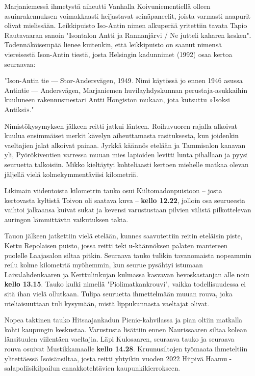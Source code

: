 \documentclass[10pt,finnish,a5paper,headings=small,twoside=semi]{scrartcl}
\begin{document}
\begin{multicols}{2}
	Marjaniemessä ihmetystä aiheutti Vanhalla Koivuniementiellä olleen
	asuinrakennuksen voimakkaasti heijastavat seinäpaneelit, joista
	varmasti naapurit olivat mielissään. Leikkipuisto Iso-Antin nimen
	alkuperää yritettiin tavata Tapio Rautavaaran sanoin "Isontalon Antti
	ja Rannanjärvi / Ne jutteli kaharen kesken". Todennäköisempää lienee
	kuitenkin, että leikkipuisto on saanut nimensä viereisestä Ison-Antin
	tiestä, josta Helsingin kadunnimet (1992) osaa kertoa seuraavaa:

	"Ison-Antin tie — Stor-Andersvägen, 1949. Nimi käytössä jo ennen 1946
	asussa Antintie — Andersvägen, Marjaniemen huvilayhdyskunnan
	perustaja-asukkaihin kuuluneen rakennusmestari Antti Hongiston mukaan,
	jota kutsuttu »Isoksi Antiksi»."

	Nimistökysymyksen jälkeen reitti jatkui länteen. Roihuvuoren rajalla
	alkoivat kuulua ensimmäiset merkit kävelyn aiheuttamasta rasituksesta,
	kun joidenkin vaeltajien jalat alkoivat painaa. Jyrkkä käännös etelään
	ja Tammisalon kanavan yli, Pyörökiventien varressa muuan mies lapioiden
	levitti lunta pihallaan ja pyysi seuruetta talkoisiin. Mikko kieltäytyi
	kohteliaasti kertoen miehelle matkaa olevan jäljellä vielä
	kolmekymmentäviisi kilometriä.

	Likimain viidentoista kilometrin tauko osui Kiiltomadonpuistoon – josta
	kertovasta kyltistä Toivon oli saatava kuva – \textbf{kello 12.22},
	jolloin osa seurueesta vaihtoi jalkaansa kuivat sukat ja kevensi
	varustustaan pilvien välistä pilkottelevan auringon lämmittävän
	vaikutuksen takia.

	Tauon jälkeen jatkettiin vielä etelään, kunnes saavutettiin reitin
	eteläisin piste, Kettu Repolaisen puisto, jossa reitti teki
	u-käännöksen palaten mantereen puolelle Laajasalon siltaa pitkin.
	Seuraava tauko tulikin tavanomaista nopeammin reilu kolme kilometriä
	myöhemmin, kun seurue pysähtyi istumaan Laivalahdenkaaren ja
	Kerttulinkujan kulmassa kasvavan hevoskastanjan alle noin \textbf{kello
	13.15}. Tauko kulki nimellä "Piolimatkankrouvi", vaikka todellisuudessa
	ei sitä ihan vielä ollutkaan. Tulipa seuruetta ihmettelmään muuan
	rouva, joka uteliaisuuttaan tuli kysymään, mistä lippukunnasta
	vaeltajat olivat.

	Nopea taktinen tauko Hitsaajankadun Picnic-kahvilassa ja pian oltiin
	matkalla kohti kaupungin keskustaa. Varustusta lisättiin ennen
	Naurissaaren siltaa kolean länsituulen viilentäen vaeltajia. Läpi
	Kulosaaren, seuraava tauko ja seuraava rouva osuivat Mustikkamaalle
	\textbf{kello 14.28}. Kruunusiltojen työmaata ihmeteltiin ylitettäessä
	Isoisänsiltaa, josta reitti yhtyikin vuoden 2022 Hiipivä Haamu
	-salapoliisikilpailun ennakkotehtävien kaupunkikierrokseen.


\end{multicols}
\end{document}
